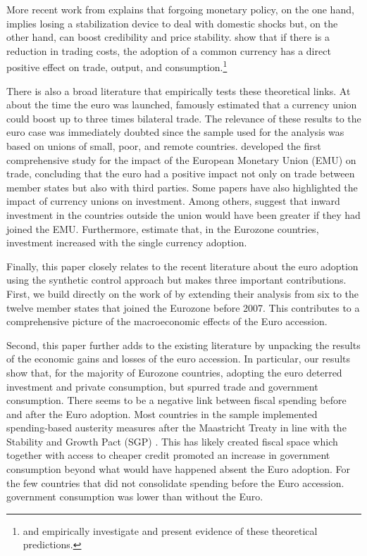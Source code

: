\documentclass[12pt]{article}
\begin{document}
More recent work from \cite{Alesina2002} explains that forgoing monetary policy, on the one hand, implies losing a stabilization device to deal with domestic shocks but, on the other hand, can boost credibility and price stability. \cite{Alesina2002} show that if there is a reduction in trading costs, the adoption of a common currency has a direct positive effect on trade, output, and consumption.\footnote{\cite{Alesina2002B} and \cite{Barro2007} empirically investigate and present evidence of these theoretical predictions.}

There is also a broad literature that empirically tests these theoretical links. At about the time the euro was launched, \cite{Rose2000} famously estimated that a currency union could boost up to three times bilateral trade. The relevance of these results to the euro case was immediately doubted since the sample used for the analysis was based on unions of small, poor, and remote countries. \cite{Micco2003} developed the first comprehensive study for the impact of the European Monetary Union (EMU) on trade, concluding that the euro had a positive impact not only on trade between member states but also with third parties. Some papers have also highlighted the impact of currency unions on investment. Among others, \cite{Barr2003} suggest that inward investment in the countries outside the union would have been greater if they had joined the EMU. Furthermore, \cite{DeSousa2011} estimate that, in the Eurozone countries, investment increased with the single currency adoption.

Finally, this paper closely relates to the recent literature about the euro adoption using the synthetic control approach \citep{Fernandez2015, Verstegen2017, Gasparotti2019} but makes three important contributions. First, we build directly on the work of \cite{Puzzello2018} by extending their analysis from six to the twelve member states that joined the Eurozone before 2007. This contributes to a comprehensive picture of the macroeconomic effects of the Euro accession. 

Second, this paper further adds to the existing literature by unpacking the results of the economic gains and losses of the euro accession. In particular, our results show that, for the majority of Eurozone countries, adopting the euro deterred investment and private consumption, but spurred trade and government consumption. There seems to be a negative link between fiscal spending before and after the Euro adoption. Most countries in the sample implemented spending-based austerity measures after the Maastricht Treaty in line with the Stability and Growth Pact (SGP) \citep{Alesina2019}. This has likely created fiscal space which together with access to cheaper credit promoted an increase in government consumption beyond what would have happened absent the Euro adoption. For the few countries that did not consolidate spending before the Euro accession. government consumption was lower than without the Euro.
\end{document}
